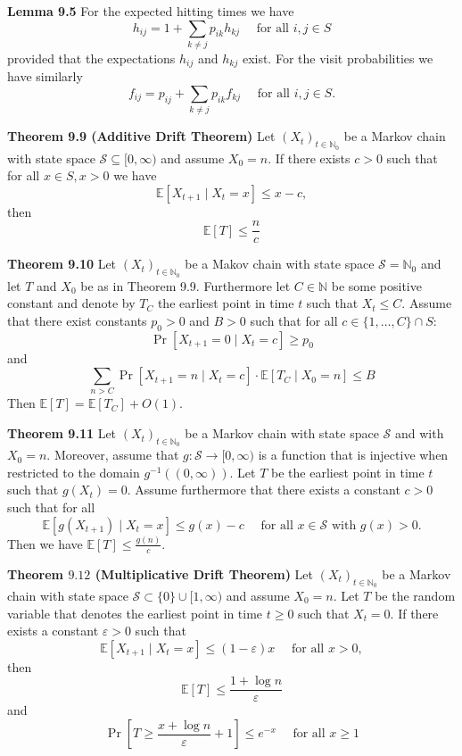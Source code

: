 \textbf{Lemma 9.5} For the expected hitting times we have
$$
h_{i j}=1+\sum_{k \neq j} p_{i k} h_{k j} \quad \text { for all } i, j \in S
$$
provided that the expectations $h_{i j}$ and $h_{k j}$ exist. For the visit probabilities we have similarly
$$
f_{i j}=p_{i j}+\sum_{k \neq j} p_{i k} f_{k j} \quad \text { for all } i, j \in S .
$$

\textbf{Theorem 9.9 (Additive Drift Theorem)}
Let $\left(X_{t}\right)_{t \in \mathbb{N}_{0}}$ be a Markov chain with state space $\mathcal{S} \subseteq[0, \infty)$ and assume $X_{0}=n$. If there exists $c>0$ such that for all $x \in S, x>0$ we have
$$
\mathbb{E}\left[X_{t+1} \mid X_{t}=x\right] \leq x-c,
$$
then
$$
\mathbb{E}[T] \leq \frac{n}{c}
$$

\textbf{Theorem 9.10} Let $\left(X_{t}\right)_{t \in \mathbb{N}_{0}}$ be a Makov chain with state space $\mathcal{S}=\mathbb{N}_{0}$ and let $T$ and $X_{0}$ be as in Theorem 9.9. Furthermore let $C \in \mathbb{N}$ be some positive constant and denote by $T_{C}$ the earliest point in time $t$ such that $X_{t} \leq C .$ Assume that there exist constants $p_{0}>0$ and $B>0$ such that for all $c \in\{1, \ldots, C\} \cap S:$
$$
\operatorname{Pr}\left[X_{t+1}=0 \mid X_{t}=c\right] \geq p_{0}
$$
and
$$
\sum_{n>C} \operatorname{Pr}\left[X_{t+1}=n \mid X_{t}=c\right] \cdot \mathbb{E}\left[T_{C} \mid X_{0}=n\right] \leq B
$$
Then $\mathbb{E}[T]=\mathbb{E}\left[T_{C}\right]+O(1)$.

\textbf{Theorem 9.11} Let $\left(X_{t}\right)_{t \in \mathbb{N}_{0}}$ be a Markov chain with state space $\mathcal{S}$ and with $X_{0}=n$. Moreover, assume that $g: \mathcal{S} \rightarrow[0, \infty)$ is a function that is injective when restricted to the domain $g^{-1}((0, \infty))$. Let $T$ be the earliest point in time $t$ such that $g\left(X_{t}\right)=0$. Assume furthermore that there exists a constant $c>0$ such that for all
$$
\mathbb{E}\left[g\left(X_{t+1}\right) \mid X_{t}=x\right] \leq g(x)-c \quad \text { for all } x \in \mathcal{S} \text { with } g(x)>0 .
$$
Then we have $\mathbb{E}[T] \leq \frac{g(n)}{c}$.

\textbf{Theorem $9.12$ (Multiplicative Drift Theorem)}
Let $\left(X_{t}\right)_{t \in \mathbb{N}_{0}}$ be a Markov chain with state space $\mathcal{S} \subset\{0\} \cup[1, \infty)$ and assume $X_{0}=n$. Let $T$ be the random variable that denotes the earliest point in time $t \geq 0$ such that $X_{t}=0$. If there exists a constant $\varepsilon>0$ such that
$$
\mathbb{E}\left[X_{t+1} \mid X_{t}=x\right] \leq(1-\varepsilon) x \quad \text { for all } x>0,
$$
then
$$
\mathbb{E}[T] \leq \frac{1+\log n}{\varepsilon}
$$
and
$$
\operatorname{Pr}\left[T \geq \frac{x+\log n}{\varepsilon}+1\right] \leq e^{-x} \quad \text { for all } x \geq 1
$$

